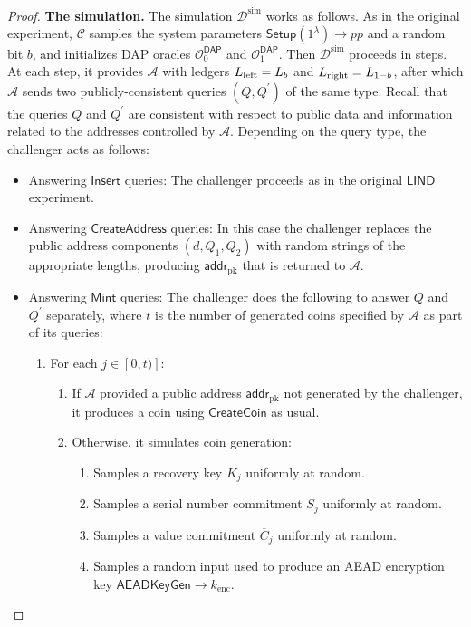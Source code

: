 \documentclass{llncs}
\newcommand{\func}[1]{\mathsf{#1}}
\newcommand{\addr}{\func{addr}}
\newcommand{\oracle}{\mathcal{O}^{\func{DAP}}}
\begin{document}
\begin{proof}
\textbf{The simulation.} The simulation $\mathcal{D}^{\text{sim}}$ works as follows.
As in the original experiment, $\mathcal{C}$ samples the system parameters $\func{Setup}(1^\lambda) \to pp$ and a random bit $b$, and initializes DAP oracles $\oracle_0$ and $\oracle_1$.
Then $\mathcal{D}^{\text{sim}}$ proceeds in steps.
At each step, it provides $\mathcal{A}$ with ledgers $L_{\text{\text{left}}} = L_{b}$ and $L_{\text{\text{right}}} = L_{1-b}$, after which $\mathcal{A}$ sends two publicly-consistent queries $(Q, Q^\prime)$ of the same type.
Recall that the queries $Q$ and $Q^\prime$ are consistent with respect to public data and information related to the addresses controlled by $\mathcal{A}$.
Depending on the query type, the challenger acts as follows:
\begin{itemize}
    \item Answering $\func{Insert}$ queries: The challenger proceeds as in the original $\func{LIND}$ experiment.
    \item Answering $\func{CreateAddress}$ queries: In this case the challenger replaces the public address components $(d,Q_1,Q_2)$ with random strings of the appropriate lengths, producing $\addr_{\text{pk}}$ that is returned to $\mathcal{A}$.
    \item Answering $\func{Mint}$ queries: The challenger does the following to answer $Q$ and $Q^\prime$ separately, where $t$ is the number of generated coins specified by $\mathcal{A}$ as part of its queries:
    \begin{enumerate}
        \item For each $j \in [0,t)]$:
        \begin{enumerate}
            \item If $\mathcal{A}$ provided a public address $\addr_{\text{pk}}$ not generated by the challenger, it produces a coin using $\func{CreateCoin}$ as usual.
            \item Otherwise, it simulates coin generation:
            \begin{enumerate}
                \item Samples a recovery key $K_j$ uniformly at random.
                \item Samples a serial number commitment $S_j$ uniformly at random.
                \item Samples a value commitment $\overline{C}_j$ uniformly at random.
                \item Samples a random input used to produce an AEAD encryption key $\func{AEADKeyGen} \to k_{\text{enc}}$.

\end{enumerate}
\end{enumerate}
\end{enumerate}
\end{itemize}
\end{proof}
\end{document}

